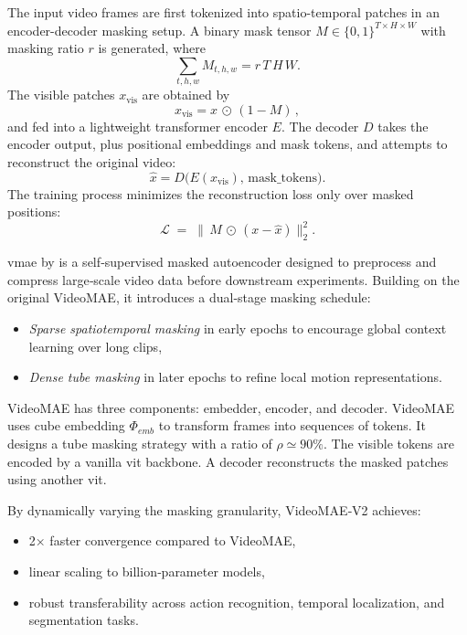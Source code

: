 The input video frames are first tokenized into spatio-temporal patches in an encoder-decoder masking setup. A binary mask tensor \(M\in\{0,1\}^{T\times H\times W}\) with masking ratio \(r\) is generated, where
\[
\sum_{t,h,w} M_{t,h,w} = r\,T\,H\,W.
\]
The visible patches \(x_\text{vis}\) are obtained by
\[
x_\text{vis} = x \,\odot\,(1 - M)\,,
\]
and fed into a lightweight transformer encoder \(E\). The decoder \(D\) takes the encoder output, plus positional embeddings and mask tokens, and attempts to reconstruct the original video:
\[
\hat{x} = D\bigl(E(x_\text{vis}),\,\text{mask\_tokens}\bigr).
\]
The training process minimizes the reconstruction loss only over masked positions:
\[
\mathcal{L} \;=\; \bigl\lVert\,M \,\odot\,(x - \hat{x})\bigr\rVert_2^2.
\]


\acrfull{vmae} by \textcite{wang_videomae_2023} is a self‑supervised masked autoencoder designed to preprocess and compress large‑scale video data before downstream experiments. Building on the original VideoMAE\cite{tong_videomae_2022}, it introduces a dual‑stage masking schedule: 

\begin{itemize}
    \item \emph{Sparse spatiotemporal masking} in early epochs to encourage global context learning over long clips,
    \item \emph{Dense tube masking} in later epochs to refine local motion representations.
\end{itemize}

VideoMAE has three components: embedder, encoder, and decoder. VideoMAE uses cube embedding \(\Phi_{emb}\) to transform frames into sequences of tokens. It designs a tube masking strategy with a ratio of \(\rho \simeq 90\%\). The visible tokens are encoded by a vanilla \acrshort{vit} backbone. A decoder reconstructs the masked patches using another \acrshort{vit}\cite{wang_videomae_2023}. 

By dynamically varying the masking granularity, VideoMAE‑V2 achieves:
\begin{itemize}
    \item 2× faster convergence compared to VideoMAE,
    \item linear scaling to billion‑parameter models,
    \item robust transferability across action recognition, temporal localization, and segmentation tasks\cite{wang_videomae_2023}.
\end{itemize}

